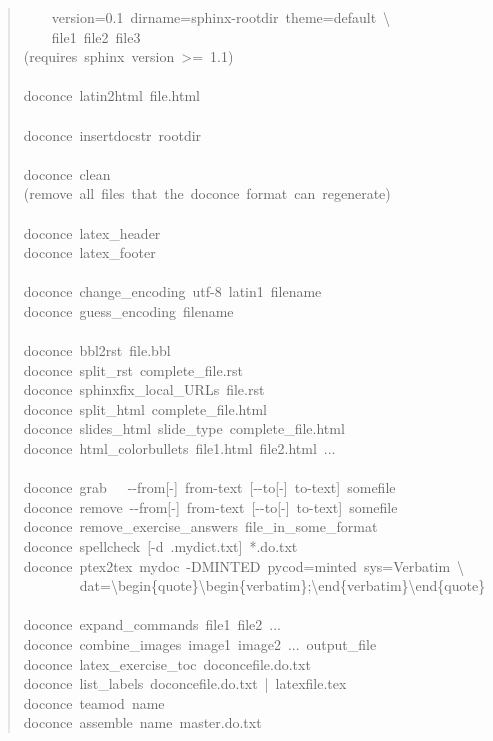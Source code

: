 \documentclass[a4paper]{article}
\begin{document}
\begin{quote}
{~~~~version=0.1~dirname=sphinx-rootdir~theme=default~\textbackslash{}\\
~~~~file1~file2~file3\\
(requires~sphinx~version~>=~1.1)\\
~\\
doconce~latin2html~file.html\\
~\\
doconce~insertdocstr~rootdir\\
~\\
doconce~clean\\
(remove~all~files~that~the~doconce~format~can~regenerate)\\
~\\
doconce~latex\_header\\
doconce~latex\_footer\\
~\\
doconce~change\_encoding~utf-8~latin1~filename\\
doconce~guess\_encoding~filename\\
~\\
doconce~bbl2rst~file.bbl\\
doconce~split\_rst~complete\_file.rst\\
doconce~sphinxfix\_local\_URLs~file.rst\\
doconce~split\_html~complete\_file.html\\
doconce~slides\_html~slide\_type~complete\_file.html\\
doconce~html\_colorbullets~file1.html~file2.html~...\\
~\\
doconce~grab~~~-{}-from{[}-{]}~from-text~{[}-{}-to{[}-{]}~to-text{]}~somefile\\
doconce~remove~-{}-from{[}-{]}~from-text~{[}-{}-to{[}-{]}~to-text{]}~somefile\\
doconce~remove\_exercise\_answers~file\_in\_some\_format\\
doconce~spellcheck~{[}-d~.mydict.txt{]}~*.do.txt\\
doconce~ptex2tex~mydoc~-DMINTED~pycod=minted~sys=Verbatim~\textbackslash{}\\
~~~~~~~~dat=\textbackslash{}begin\{quote\}\textbackslash{}begin\{verbatim\};\textbackslash{}end\{verbatim\}\textbackslash{}end\{quote\}\\
~\\
doconce~expand\_commands~file1~file2~...\\
doconce~combine\_images~image1~image2~...~output\_file\\
doconce~latex\_exercise\_toc~doconcefile.do.txt\\
doconce~list\_labels~doconcefile.do.txt~|~latexfile.tex\\
doconce~teamod~name\\
doconce~assemble~name~master.do.txt
}
\end{quote}
\end{document}
